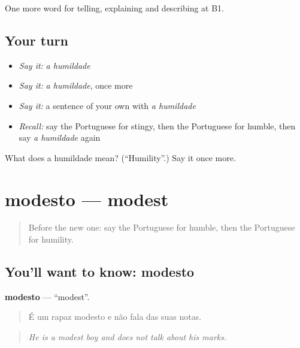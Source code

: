 \begin{grammarlens}[title={What you've built}]
One more word for telling, explaining and describing at B1.
\end{grammarlens}

\subsection*{Your turn}
\begin{itemize}
\raggedright
  \item \emph{Say it:} \emph{a humildade}
  \item \emph{Say it:} \emph{a humildade}, once more
  \item \emph{Say it:} a sentence of your own with \emph{a humildade}
  \item \emph{Recall:} say the Portuguese for stingy, then the Portuguese for humble, then say \emph{a humildade} again
\end{itemize}

\begin{tcolorbox}[breakable,colback=teal!4,colframe=teal!35!black,title={Before you move on}]
What does a humildade mean? (\textquotedblleft{}Humility\textquotedblright{}.) Say it once more.
\end{tcolorbox}
\section[modesto]{modesto — modest}

\label{lesson:PT-C470-modesto}



\begin{quote}
Before the new one: say the Portuguese for humble, then the Portuguese for humility.
\end{quote}

\subsection*{You'll want to know: modesto}
\textbf{modesto} — \textquotedblleft{}modest\textquotedblright{}.

\begin{quote}
É um rapaz modesto e não fala das suas notas.
\end{quote}

\begin{quote}
\emph{He is a modest boy and does not talk about his marks.}
\end{quote}

